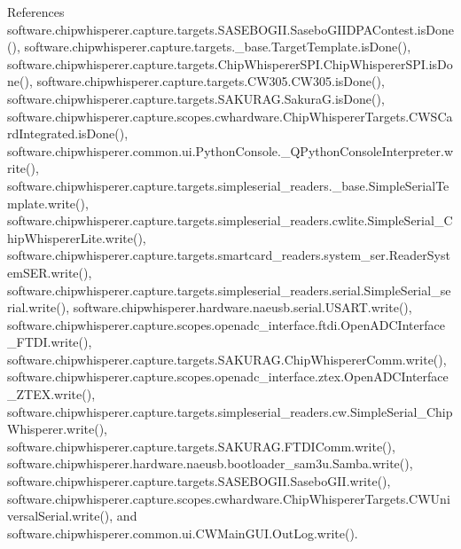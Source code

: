 References software.\+chipwhisperer.\+capture.\+targets.\+S\+A\+S\+E\+B\+O\+G\+I\+I.\+Sasebo\+G\+I\+I\+D\+P\+A\+Contest.\+is\+Done(), software.\+chipwhisperer.\+capture.\+targets.\+\_\+base.\+Target\+Template.\+is\+Done(), software.\+chipwhisperer.\+capture.\+targets.\+Chip\+Whisperer\+S\+P\+I.\+Chip\+Whisperer\+S\+P\+I.\+is\+Done(), software.\+chipwhisperer.\+capture.\+targets.\+C\+W305.\+C\+W305.\+is\+Done(), software.\+chipwhisperer.\+capture.\+targets.\+S\+A\+K\+U\+R\+A\+G.\+Sakura\+G.\+is\+Done(), software.\+chipwhisperer.\+capture.\+scopes.\+cwhardware.\+Chip\+Whisperer\+Targets.\+C\+W\+S\+Card\+Integrated.\+is\+Done(), software.\+chipwhisperer.\+common.\+ui.\+Python\+Console.\+\_\+\+Q\+Python\+Console\+Interpreter.\+write(), software.\+chipwhisperer.\+capture.\+targets.\+simpleserial\+\_\+readers.\+\_\+base.\+Simple\+Serial\+Template.\+write(), software.\+chipwhisperer.\+capture.\+targets.\+simpleserial\+\_\+readers.\+cwlite.\+Simple\+Serial\+\_\+\+Chip\+Whisperer\+Lite.\+write(), software.\+chipwhisperer.\+capture.\+targets.\+smartcard\+\_\+readers.\+system\+\_\+ser.\+Reader\+System\+S\+E\+R.\+write(), software.\+chipwhisperer.\+capture.\+targets.\+simpleserial\+\_\+readers.\+serial.\+Simple\+Serial\+\_\+serial.\+write(), software.\+chipwhisperer.\+hardware.\+naeusb.\+serial.\+U\+S\+A\+R\+T.\+write(), software.\+chipwhisperer.\+capture.\+scopes.\+openadc\+\_\+interface.\+ftdi.\+Open\+A\+D\+C\+Interface\+\_\+\+F\+T\+D\+I.\+write(), software.\+chipwhisperer.\+capture.\+targets.\+S\+A\+K\+U\+R\+A\+G.\+Chip\+Whisperer\+Comm.\+write(), software.\+chipwhisperer.\+capture.\+scopes.\+openadc\+\_\+interface.\+ztex.\+Open\+A\+D\+C\+Interface\+\_\+\+Z\+T\+E\+X.\+write(), software.\+chipwhisperer.\+capture.\+targets.\+simpleserial\+\_\+readers.\+cw.\+Simple\+Serial\+\_\+\+Chip\+Whisperer.\+write(), software.\+chipwhisperer.\+capture.\+targets.\+S\+A\+K\+U\+R\+A\+G.\+F\+T\+D\+I\+Comm.\+write(), software.\+chipwhisperer.\+hardware.\+naeusb.\+bootloader\+\_\+sam3u.\+Samba.\+write(), software.\+chipwhisperer.\+capture.\+targets.\+S\+A\+S\+E\+B\+O\+G\+I\+I.\+Sasebo\+G\+I\+I.\+write(), software.\+chipwhisperer.\+capture.\+scopes.\+cwhardware.\+Chip\+Whisperer\+Targets.\+C\+W\+Universal\+Serial.\+write(), and software.\+chipwhisperer.\+common.\+ui.\+C\+W\+Main\+G\+U\+I.\+Out\+Log.\+write().


